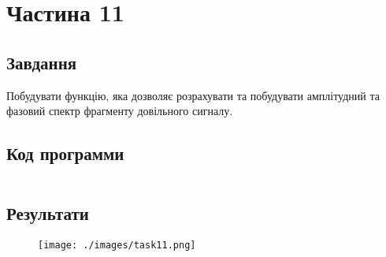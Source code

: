 \section{Частина 11}
\label{sec:task11}

\subsection{Завдання}
\label{subsec:task11_task}

Побудувати функцію, яка дозволяє розрахувати та побудувати
амплітудний та фазовий спектр фрагменту довільного сигналу.

\subsection{Код программи}
\label{subsec:task11_code}
\inputminted{python}{../src/task11.py}

\subsection{Результати}
\label{subsec:task11_results}

\begin{figure}[!ht]
    \centering
    \texttt{[image: ./images/task11.png]}
\end{figure}
